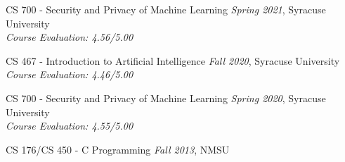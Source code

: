 \beginList
  \item CS 700 - Security and Privacy of Machine Learning 
  \hfill{\em Spring  2021}, Syracuse University\\
  {\em Course Evaluation: 4.56/5.00}%

  \item CS 467 - Introduction to Artificial Intelligence
  \hfill{\em Fall 2020}, Syracuse University\\
  {\em Course Evaluation: 4.46/5.00}%

  \item CS 700 - Security and Privacy of Machine Learning 
  \hfill{\em Spring 2020}, Syracuse University\\
  {\em Course Evaluation: 4.55/5.00}

 \item CS 176/CS 450 - C Programming
  \hfill {\em Fall 2013}, NMSU
\endList

  
  
  
